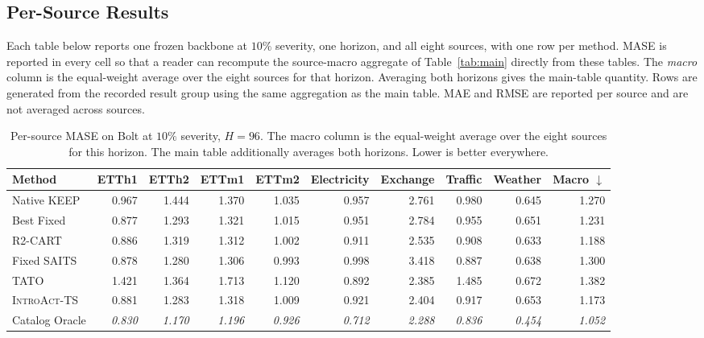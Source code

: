 \documentclass{article}
\newcommand{\oracle}[1]{\textit{\textcolor{phgray}{#1}}}
\newcommand{\introact}{\textsc{IntroAct-TS}}
\begin{document}
\subsection{Per-Source Results}
\label{app:datasets}
Each table below reports one frozen backbone at $10\%$ severity, one horizon, and
all eight sources, with one row per method. MASE is reported in every cell so that a
reader can recompute the source-macro aggregate of Table~\ref{tab:main} directly from
these tables. The \emph{macro} column is the equal-weight average over the eight sources
for that horizon. Averaging both horizons gives the main-table quantity. Rows are generated from the recorded result
group using the same aggregation as the main table.
MAE and RMSE are reported per source and are not averaged across sources.

\begin{table}[!t]
  \caption{Per-source MASE on Bolt at $10\%$ severity, $H=96$. The macro column is the
  equal-weight average over the eight sources for this horizon. The main table additionally averages both horizons. Lower is better everywhere.}
  \label{tab:app-src-bolt-96}
  \centering
  \small
  \setlength{\tabcolsep}{3pt}
\begin{tabular*}{\textwidth}{@{\extracolsep{\fill}}lrrrrrrrrr@{}}
    \toprule
    Method & ETTh1 & ETTh2 & ETTm1 & ETTm2 & Electricity & Exchange & Traffic & Weather & Macro $\downarrow$ \\
    \midrule
    Native KEEP & 0.967 & 1.444 & 1.370 & 1.035 & 0.957 & 2.761 & 0.980 & 0.645 & 1.270 \\
    Best Fixed & 0.877 & 1.293 & 1.321 & 1.015 & 0.951 & 2.784 & 0.955 & 0.651 & 1.231 \\
    R2-CART & 0.886 & 1.319 & 1.312 & 1.002 & 0.911 & 2.535 & 0.908 & 0.633 & 1.188 \\
    Fixed SAITS & 0.878 & 1.280 & 1.306 & 0.993 & 0.998 & 3.418 & 0.887 & 0.638 & 1.300 \\
    TATO & 1.421 & 1.364 & 1.713 & 1.120 & 0.892 & 2.385 & 1.485 & 0.672 & 1.382 \\
    \midrule
    \rowcolor{bestgray}\introact{} & 0.881 & 1.283 & 1.318 & 1.009 & 0.921 & 2.404 & 0.917 & 0.653 & 1.173 \\
    \midrule
    Catalog Oracle & \oracle{0.830} & \oracle{1.170} & \oracle{1.196} & \oracle{0.926} & \oracle{0.712} & \oracle{2.288} & \oracle{0.836} & \oracle{0.454} & \oracle{1.052} \\
    \bottomrule
  \end{tabular*}
\end{table}
\end{document}
